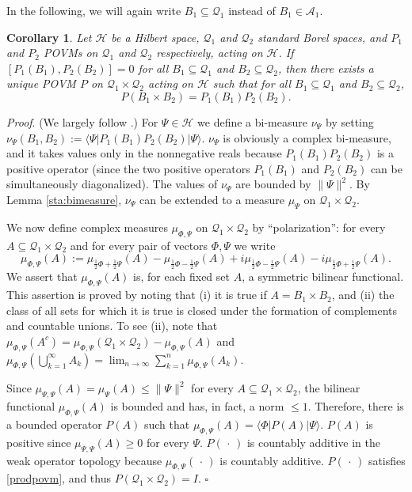 \documentclass[12pt]{article}
\newcommand{\1}{\mathbf{1}} %
\newcommand{\Hilbert}{\mathscr{H}}
\renewcommand{\sp}[2]{\langle #1 | #2 \rangle} %
\newcommand{\conf}{\mathcal{Q}} %
\newcommand{\salg}{\mathcal{A}} %
\newcommand{\pov}{{P}}%
\newtheorem{corollary}{Corollary}
\newenvironment{proof}{\noindent 
\textit{Proof}.}{\hfill$\square$\bigskip}
\begin{document}
In the following, we will again write $B_1 \subseteq \conf_1$ instead
of $B_1 \in \salg_1$.

\begin{corollary}\label{sta:prodpovm}
   Let $\Hilbert$ be a Hilbert space, $\conf_1$ and $\conf_2$ standard
   Borel spaces, and $\pov_1$ and $\pov_2$ POVMs on $\conf_1$ and
   $\conf_2$ respectively, acting on $\Hilbert$. If
   $[\pov_1(B_1),\pov_2(B_2)]=0$ for all $B_1 \subseteq \conf_1$ and
   $B_2 \subseteq \conf_2$, then there exists a unique POVM $\pov$ on
   $\conf_1 \times \conf_2$ acting on $\Hilbert$ such that for all $B_1
   \subseteq \conf_1$ and $B_2 \subseteq \conf_2$,
   \begin{equation}\label{prodpovm}
     \pov(B_1 \times B_2) = \pov_1(B_1) \pov_2(B_2).
   \end{equation}
\end{corollary}

\begin{proof}
(We largely follow \cite[p.~72]{HalHil}.) For $\Psi \in \Hilbert$ we
define a bi-measure $\nu_\Psi$ by setting $\nu_\Psi(B_1, B_2) := 
\sp{\Psi}
{\pov_1(B_1) \pov_2(B_2) | \Psi}$. $\nu_\Psi$ is obviously a complex
bi-measure, and it takes values only in the nonnegative reals because
$\pov_1(B_1) \pov_2(B_2)$ is a positive operator (since the two
positive operators $\pov_1(B_1)$ and $\pov_2(B_2)$ can be
simultaneously diagonalized). The values of $\nu_\Psi$ are bounded by
$\|\Psi\|^2$. By Lemma \ref{sta:bimeasure}, $\nu_\Psi$ can be extended
to a measure $\mu_\Psi$ on $\conf_1 \times \conf_2$.

We now define complex measures $\mu_{\Phi,\Psi}$ on $\conf_1 \times
\conf_2$ by ``polarization'': for every $A \subseteq \conf_1 \times
\conf_2$ and for every pair of vectors $\Phi,\Psi$ we write
\begin{equation}
   \mu_{\Phi,\Psi}(A) := \mu_{\frac 12 \Phi + \frac 12 \Psi}(A) -
   \mu_{\frac 12 \Phi - \frac 12 \Psi}(A) + i\mu_{\frac 12 \Phi - \frac
   i2 \Psi}(A) -i\mu_{\frac 12 \Phi + \frac i2 \Psi}(A).
\end{equation}
We assert that $\mu_{\Phi,\Psi}(A)$ is, for each fixed set $A$, a
symmetric bilinear functional. This assertion is proved by noting that
(i) it is true if $A= B_1 \times B_2$, and (ii) the class of all sets
for which it is true is closed under the formation of complements and
countable unions. To see (ii), note that $\mu_{\Phi,\Psi}(A^c) =
\mu_{\Phi,\Psi}(\conf_1 \times \conf_2) - \mu_{\Phi,\Psi}(A)$ and
$\mu_{\Phi,\Psi}(\bigcup^\infty_{k=1} A_k) = \lim_{n \to \infty}
\sum_{k=1}^n \mu_{\Phi,\Psi}(A_k)$.

Since $\mu_{\Psi,\Psi}(A) = \mu_\Psi(A) \leq \|\Psi\|^2$ for every
$A\subseteq \conf_1 \times \conf_2$, the bilinear functional
$\mu_{\Phi,\Psi}(A)$ is bounded and has, in fact, a norm $\leq
1$. Therefore, there is a bounded operator $\pov(A)$ such that
$\mu_{\Phi,\Psi}(A) = \sp{\Phi} {\pov(A)| \Psi}$. $\pov(A)$ is
positive since $\mu_{\Psi,\Psi}(A) \geq 0$ for every
$\Psi$. $\pov(\,\cdot\,)$ is countably additive in the weak operator
topology because $\mu_{\Phi,\Psi}(\,\cdot\,)$ is countably additive.
$\pov(\,\cdot\,)$ satisfies \eqref{prodpovm}, and thus $\pov(\conf_1
\times \conf_2) = I$.
\end{proof}
\end{document}
